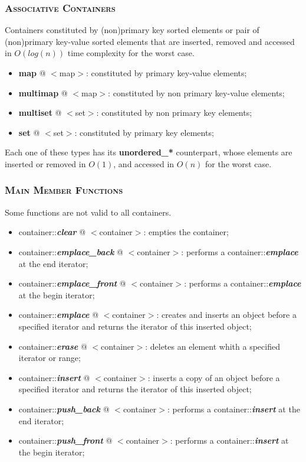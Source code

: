 \documentclass[10pt]{article}
\begin{document}
\begin{multicols*}{4}
{\subsubsection*{\textsc{Associative Containers}} 
\noindent
Containers constituted by (non)primary key sorted elements or pair of (non)primary key-value sorted elements that are  inserted, removed and accessed in $O(log(n))$ time complexity for the worst case.

\begin{itemize}[leftmargin=*,topsep=0.25pt]
  \setlength\itemsep{-1.8pt}
	\item \textbf{map} @ $<$map$>$: constituted by primary key-value elements;
	\item \textbf{multimap} @ $<$map$>$: constituted by non primary key-value elements;  
	\item \textbf{multiset} @ $<$set$>$: constituted by non primary key elements;
	\item \textbf{set} @ $<$set$>$: constituted by primary key elements;
\end{itemize}
\noindent
Each one of these types has its \textbf{unordered\_*} counterpart, whose elements are inserted or removed in $O(1)$, and accessed in $O(n)$ for the worst case. 


\subsubsection*{\textsc{Main Member Functions}} 
\noindent Some functions are not valid to all containers.

\begin{itemize}[leftmargin=*,topsep=0.25pt]
  \setlength\itemsep{-1.8pt}
	\item container::\emph{\textbf{clear}} @ $<$container$>$: empties the container;
	\item container::\emph{\textbf{emplace\_back}} @ $<$container$>$: performs a container::\emph{\textbf{emplace}} at the end iterator;
	\item container::\emph{\textbf{emplace\_front}} @ $<$container$>$: performs a container::\emph{\textbf{emplace}} at the begin iterator;
	\item container::\emph{\textbf{emplace}} @ $<$container$>$: creates and inserts an object before a specified iterator and returns the iterator of this inserted object;
	\item container::\emph{\textbf{erase}} @ $<$container$>$: deletes an element whith a specified iterator or range;
	\item container::\emph{\textbf{insert}} @ $<$container$>$: inserts a copy of an object before a specified iterator and returns the iterator of this inserted object;
	\item container::\emph{\textbf{push\_back}} @ $<$container$>$: performs a container::\emph{\textbf{insert}} at the end iterator;
	\item container::\emph{\textbf{push\_front}} @ $<$container$>$: performs a container::\emph{\textbf{insert}} at the begin iterator;
\end{itemize}
\noindent

}
\end{multicols*}
\end{document}
